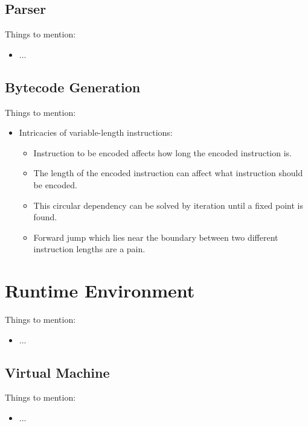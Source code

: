 \subsection{Parser}

{
  \color{red}
  Things to mention:

  \begin{itemize}
    \item ...
  \end{itemize}
}

\subsection{Bytecode Generation}

{
  \color{red}
  Things to mention:

  \begin{itemize}
    \item
      Intricacies of variable-length instructions:
      \begin{itemize}
        \item
          Instruction to be encoded affects how long the encoded instruction is.
        \item
          The length of the encoded instruction can affect what instruction
          should be encoded.
        \item
          This circular dependency can be solved by iteration until a fixed
          point is found.
        \item
          Forward jump which lies near the boundary between two different
          instruction lengths are a pain.
      \end{itemize}
  \end{itemize}
}

\section{Runtime Environment}

{
  \color{red}
  Things to mention:

  \begin{itemize}
    \item ...
  \end{itemize}
}

\subsection{Virtual Machine}

{
  \color{red}
  Things to mention:

  \begin{itemize}
    \item ...
  \end{itemize}
}

